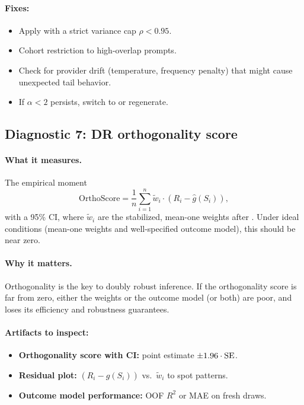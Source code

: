 \paragraph{Fixes:}
\begin{itemize}
\item Apply \simcal{} with a strict variance cap $\rho < 0.95$.
\item Cohort restriction to high-overlap prompts.
\item Check for provider drift (temperature, frequency penalty) that might cause unexpected tail behavior.
\item If $\alpha < 2$ persists, switch to \dr{} or regenerate.
\end{itemize}

\subsection{Diagnostic 7: DR orthogonality score}

\paragraph{What it measures.} The empirical moment
\begin{equation}
\text{OrthoScore} = \frac{1}{n} \sum_{i=1}^n \tilde{w}_i \cdot (R_i - \hat{g}(S_i)),
\end{equation}
with a 95\% CI, where $\tilde{w}_i$ are the stabilized, mean-one weights after \simcal. Under ideal conditions (mean-one weights and well-specified outcome model), this should be near zero.

\paragraph{Why it matters.} Orthogonality is the key to doubly robust inference. If the orthogonality score is far from zero, either the weights or the outcome model (or both) are poor, and \dr{} loses its efficiency and robustness guarantees.

\paragraph{Artifacts to inspect:}
\begin{itemize}
\item \textbf{Orthogonality score with CI:} point estimate $\pm 1.96 \cdot \operatorname{SE}$.
\item \textbf{Residual plot:} $(R_i - \hat{g}(S_i))$ vs.\ $\tilde{w}_i$ to spot patterns.
\item \textbf{Outcome model performance:} OOF $R^2$ or MAE on fresh draws.
\end{itemize}


